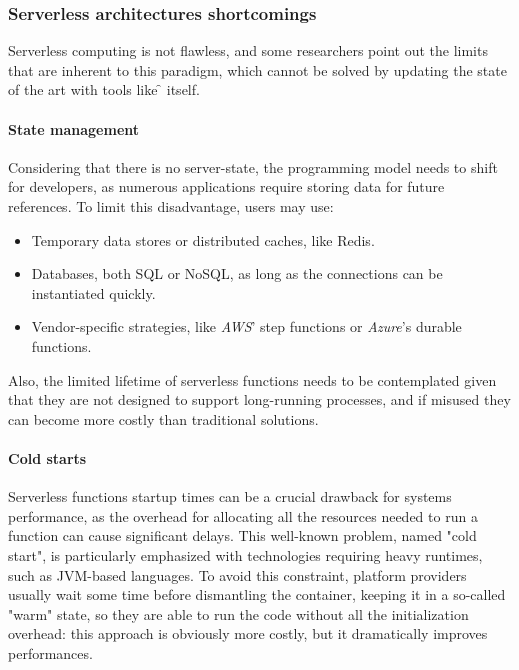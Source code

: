\subsubsection{Serverless architectures shortcomings}

Serverless computing is not flawless, and some researchers \cite{two-steps-back}
point out the limits that are inherent to this paradigm, which cannot be solved
by updating the state of the art with tools like \f{} itself.

\paragraph{\textbf{State management}} Considering that there is no server-state,
the programming model needs to shift for developers, as numerous applications require
storing data for future references.
To limit this disadvantage, users may use:
\begin{itemize}
  \item Temporary data stores or distributed caches, like Redis.
  \item Databases, both SQL or NoSQL, as long as the connections can be instantiated quickly.
  \item Vendor-specific strategies, like \textit{AWS}' step functions or \textit{Azure}'s durable functions.
\end{itemize}
Also, the limited lifetime of serverless functions needs to be contemplated given that
they are not designed to support long-running processes,
and if misused they can become more costly than traditional solutions.

\paragraph{\textbf{Cold starts}} Serverless functions startup times
can be a crucial drawback for systems performance, as the overhead for
allocating all the resources needed to run a function can cause significant
delays. This well-known problem, named "cold start", is
particularly emphasized with technologies requiring heavy runtimes, such as JVM-based languages.
To avoid this constraint, platform providers usually wait some time
before dismantling the container, keeping it in a so-called "warm" state,
so they are able to run the code without all the initialization overhead:
this approach is obviously more costly, but it dramatically improves performances.

